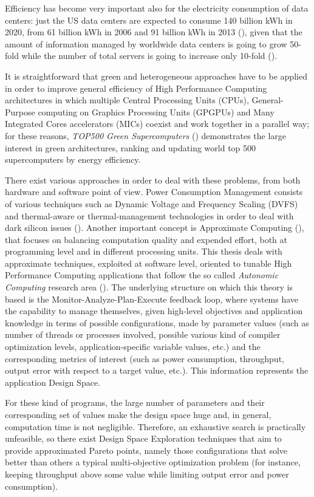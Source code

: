 Efficiency has become very important also for the electricity consumption of data centers: just the US data centers are expected to consume 140 billion kWh in 2020, from 61 billion kWh in 2006 and 91 billion kWh in 2013 (\cite{site:NRDC2015}), given that the amount of information managed by worldwide data centers is going to grow 50-fold while the number of total servers is going to increase only 10-fold (\cite{gantz2011extracting}).

It is straightforward that green and heterogeneous approaches have to be applied in order to improve general efficiency of High Performance Computing architectures in which multiple Central Processing Units (CPUs), General-Purpose computing on Graphics Processing Units (GPGPUs) and Many Integrated Cores accelerators (MICs) coexist and work together in a parallel way; for these reasons, \textit{TOP500 Green Supercomputers} (\cite{site:topGreen500}) demonstrates the large interest in green architectures, ranking and updating world top 500 supercomputers by energy efficiency.

There exist various approaches in order to deal with these problems, from both hardware and software point of view. Power Consumption Management consists of various techniques such as Dynamic Voltage and Frequency Scaling (DVFS) and ther\-mal-aware or ther\-mal-management technologies in order to deal with dark silicon issues (\cite{mittal2014power}). Another important concept is Approximate Computing (\cite{mittal2016survey}), that focuses on balancing computation quality and expended effort, both at programming level and in different processing units. This thesis deals with approximate techniques, exploited at software level, oriented to tunable High Performance Computing applications that follow the so called \textit{Autonomic Computing} research area (\cite{kephart2003vision}). The underlying structure on which this theory is based is the Monitor-Analyze-Plan-Execute feedback loop, where systems have the capability to manage themselves, given high-level objectives and application knowledge in terms of possible configurations, made by parameter values (such as number of threads or processes involved, possible various kind of compiler optimization levels, application-specific variable values, etc.) and the corresponding metrics of interest (such as power consumption, throughput, output error with respect to a target value, etc.). This information represents the application Design Space.

For these kind of programs, the large number of parameters and their corresponding set of values make the design space huge and, in general, computation time is not negligible. Therefore, an exhaustive search is practically unfeasible, so there exist Design Space Exploration techniques that aim to provide approximated Pareto points, namely those configurations that solve better than others a typical multi-objective optimization problem (for instance, keeping throughput above some value while limiting output error and power consumption).


